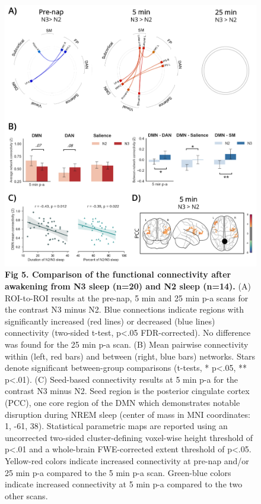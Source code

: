 \begin{figure}[htb!]
	\includegraphics[width=\textwidth]{Fig/Results/Inertia/Inertia/Fig5_N2vsN3.png}
	\caption*{\textbf{Fig 5. Comparison of the functional connectivity after awakening from N3 sleep (n=20) and N2 sleep (n=14).} (A) ROI-to-ROI results at the pre-nap, 5 min and 25 min p-a scans for the contrast N3 minus N2. Blue connections indicate regions with significantly increased (red lines) or decreased (blue lines) connectivity (two-sided t-test, p<.05 FDR-corrected). No difference was found for the 25 min p-a scan. (B) Mean pairwise connectivity within (left, red bars) and between (right, blue bars) networks. Stars denote significant between-group comparisons (t-tests, * p<.05, ** p<.01). (C) Seed-based connectivity results at 5 min p-a for the contrast N3 minus N2. Seed region is the posterior cingulate cortex (PCC), one core region of the DMN which demonstrates notable disruption during NREM sleep (center of mass in MNI coordinates: 1, -61, 38). Statistical parametric maps are reported using an uncorrected two-sided cluster-defining voxel-wise height threshold of p<.01 and a whole-brain FWE-corrected extent threshold of p<.05. Yellow-red colors indicate increased connectivity at pre-nap and/or 25 min p-a compared to the 5 min p-a scan. Green-blue colors indicate increased connectivity at 5 min p-a compared to the two other scans.}
\end{figure}

